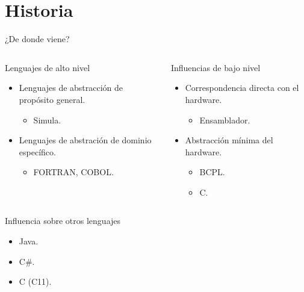 \section{Historia}

\begin{frame}[t,shrink=10]{¿De donde viene?}
\begin{columns}[T]

\pause
{}
\begin{block}{Lenguajes de alto nivel}
    \begin{itemize}
      \item Lenguajes de abstracción de propósito general.
        \begin{itemize}
          \item Simula.
        \end{itemize}
      \item Lenguajes de abstración de dominio específico.
        \begin{itemize}
          \item FORTRAN, COBOL.
        \end{itemize}
    \end{itemize}
\end{block}

\pause
{}
\begin{block}{Influencias de bajo nivel}
    \begin{itemize}
      \item Correspondencia directa con el hardware.
        \begin{itemize}
          \item Ensamblador.
        \end{itemize}
      \item Abstracción mínima del hardware.
        \begin{itemize}
          \item BCPL.
          \item C.
        \end{itemize}
    \end{itemize}
\end{block}

\end{columns}

\vfill\pause
\begin{block}{Influencia sobre otros lenguajes}
    \begin{itemize}
      \item Java.
      \item C\#.
      \item C (C11).
    \end{itemize}
\end{block}

\end{frame}


